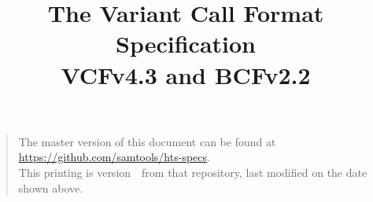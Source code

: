 \documentclass[8pt]{article}
\begin{document}

\title{The Variant Call Format Specification \\ \vspace{0.5em} \large VCFv4.3 and BCFv2.2}
\date{\headdate}
\maketitle
\begin{quote}\small
The master version of this document can be found at
\url{https://github.com/samtools/hts-specs}.\\
This printing is version~\commitdesc\ from that repository,
last modified on the date shown above.
\end{quote}
\vspace*{1em}

\newpage
\tableofcontents
\newpage











\pagebreak




\end{document}
